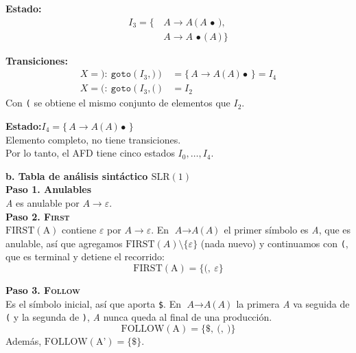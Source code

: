 \documentclass[12pt,letterpaper]{article}
\newcommand{\nt}[1]{\textit{#1}}
\newcommand{\tk}[1]{\texttt{#1}}
\newcommand{\tx}[1]{\text{#1}}
\newcommand{\First}[1]{\mathrm{FIRST}(#1)}
\newcommand{\Follow}[1]{\mathrm{FOLLOW}(#1)}
\newcommand{\slr}{\mathrm{SLR(1)}}
\newcommand{\eps}{\varepsilon}
\begin{document}
\begin{enumerate}[label=\arabic*.]
  \medskip

  \textbf{Estado:}
  \[
  \begin{aligned}
    I_3 = \{\, & \nt{A}\to\nt{A}\,\tk{(}\,\nt{A}\,\bullet\,\tk{)},\\
               & \nt{A}\to\nt{A}\,\bullet\,\tk{(}\,\nt{A}\,\tk{)}\,\}
  \end{aligned}
  \]

  \textbf{Transiciones:}
  \[
  \begin{aligned}
    X=\tk{)}:\ \texttt{goto}(I_3,\tk{)}) &= \{\,\nt{A}\to\nt{A}\,\tk{(}\,\nt{A}\,\tk{)}\,\bullet\,\} = \boxed{I_4}\\[4pt]
    X=\tk{(}:\ \texttt{goto}(I_3,\tk{(}) &= I_2
  \end{aligned}
  \]
  Con \tk{(} se obtiene el mismo conjunto de elementos que $I_2$.

  \medskip

  \textbf{Estado:}\quad $I_4 = \{\,\nt{A}\to\nt{A}\,\tk{(}\,\nt{A}\,\tk{)}\,\bullet\,\}$\\
  Elemento completo, no tiene transiciones.\\

  Por lo tanto, el AFD tiene cinco estados $I_0,\ldots,I_4$.

  \bigskip

  \textbf{\large b. Tabla de análisis sintáctico $\slr$}\\

  \textbf{Paso 1. Anulables}\\
  \nt{A} es anulable por $\nt{A}\to\eps$.\\

  \textbf{Paso 2. \textsc{First}}\\
  $\First{\tx{A}}$ contiene $\eps$ por $\nt{A}\to\eps$. En $\nt{A}\to\nt{A}\,\tk{(}\,\nt{A}\,\tk{)}$ el primer
  símbolo es \nt{A}, que es anulable, así que agregamos $\First{\nt{A}}\setminus\{\eps\}$ (nada nuevo) y
  continuamos con \tk{(}, que es terminal y detiene el recorrido:
  \[
  \First{\tx{A}} = \{\tk{(},\ \eps\}
  \]

  \textbf{Paso 3. \textsc{Follow}}\\
  Es el símbolo inicial, así que aporta \tk{\$}. En $\nt{A}\to\nt{A}\,\tk{(}\,\nt{A}\,\tk{)}$ la primera
  \nt{A} va seguida de \tk{(} y la segunda de \tk{)}, \nt{A} nunca queda al final de una producción.
  \[
  \Follow{\tx{A}} = \{\tk{\$},\ \tk{(},\ \tk{)}\}
  \]
  Además, $\Follow{\tx{A'}} = \{\tk{\$}\}$.\\


\end{enumerate}
\end{document}
